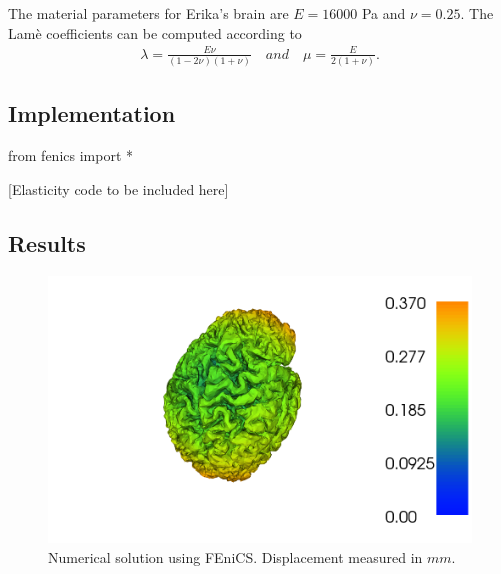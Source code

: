 \documentclass[epsfig,11pt]{article}
\begin{document}
The material parameters for Erika's brain are $E = 16000 $ Pa and $\nu = 0.25$. The Lamè coefficients can be computed according to 
\begin{align*}
\lambda = \frac{E \nu}{(1-2\nu)(1+\nu)} \quad and \quad \mu = \frac{E}{2(1+\nu)}.
\end{align*}

\subsection{Implementation}

\begin{python}
from fenics import *

[Elasticity code to be included here]

\end{python}

\subsection{Results}

 \begin{figure}[h!] 
\begin{center}
  \includegraphics[scale=0.4]{brain.png}
  \end{center}
  \caption{Numerical solution using FEniCS. Displacement measured in $mm$.}
\end{figure}



\end{document}
